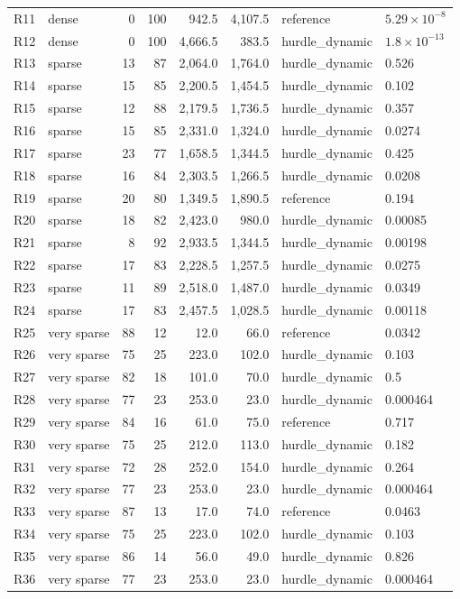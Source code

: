 \begin{table}[htbp]
\begin{tabular}{llrrrrll}
R11 & dense & 0 & 100 & 942.5 & 4,107.5 & reference & $5.29 \times 10^{-8}$ \\
R12 & dense & 0 & 100 & 4,666.5 & 383.5 & hurdle\_dynamic & $1.8 \times 10^{-13}$ \\
R13 & sparse & 13 & 87 & 2,064.0 & 1,764.0 & hurdle\_dynamic & 0.526 \\
R14 & sparse & 15 & 85 & 2,200.5 & 1,454.5 & hurdle\_dynamic & 0.102 \\
R15 & sparse & 12 & 88 & 2,179.5 & 1,736.5 & hurdle\_dynamic & 0.357 \\
R16 & sparse & 15 & 85 & 2,331.0 & 1,324.0 & hurdle\_dynamic & 0.0274 \\
R17 & sparse & 23 & 77 & 1,658.5 & 1,344.5 & hurdle\_dynamic & 0.425 \\
R18 & sparse & 16 & 84 & 2,303.5 & 1,266.5 & hurdle\_dynamic & 0.0208 \\
R19 & sparse & 20 & 80 & 1,349.5 & 1,890.5 & reference & 0.194 \\
R20 & sparse & 18 & 82 & 2,423.0 & 980.0 & hurdle\_dynamic & 0.00085 \\
R21 & sparse & 8 & 92 & 2,933.5 & 1,344.5 & hurdle\_dynamic & 0.00198 \\
R22 & sparse & 17 & 83 & 2,228.5 & 1,257.5 & hurdle\_dynamic & 0.0275 \\
R23 & sparse & 11 & 89 & 2,518.0 & 1,487.0 & hurdle\_dynamic & 0.0349 \\
R24 & sparse & 17 & 83 & 2,457.5 & 1,028.5 & hurdle\_dynamic & 0.00118 \\
R25 & very sparse & 88 & 12 & 12.0 & 66.0 & reference & 0.0342 \\
R26 & very sparse & 75 & 25 & 223.0 & 102.0 & hurdle\_dynamic & 0.103 \\
R27 & very sparse & 82 & 18 & 101.0 & 70.0 & hurdle\_dynamic & 0.5 \\
R28 & very sparse & 77 & 23 & 253.0 & 23.0 & hurdle\_dynamic & 0.000464 \\
R29 & very sparse & 84 & 16 & 61.0 & 75.0 & reference & 0.717 \\
R30 & very sparse & 75 & 25 & 212.0 & 113.0 & hurdle\_dynamic & 0.182 \\
R31 & very sparse & 72 & 28 & 252.0 & 154.0 & hurdle\_dynamic & 0.264 \\
R32 & very sparse & 77 & 23 & 253.0 & 23.0 & hurdle\_dynamic & 0.000464 \\
R33 & very sparse & 87 & 13 & 17.0 & 74.0 & reference & 0.0463 \\
R34 & very sparse & 75 & 25 & 223.0 & 102.0 & hurdle\_dynamic & 0.103 \\
R35 & very sparse & 86 & 14 & 56.0 & 49.0 & hurdle\_dynamic & 0.826 \\
R36 & very sparse & 77 & 23 & 253.0 & 23.0 & hurdle\_dynamic & 0.000464 \\
\bottomrule
\end{tabular}
\end{table}

